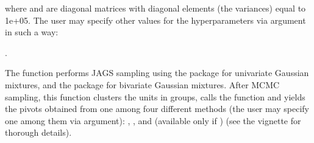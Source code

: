 \documentclass[a4paper]{book}
\begin{document}
\begin{Details}
where  and  are diagonal matrices
with diagonal elements (the variances)
equal to 1e+05. The user may specify other values for the hyperparameters
 via  argument in such a way:

.


The function performs JAGS sampling using the  package for univariate Gaussian mixtures, and the 
package for bivariate Gaussian mixtures. After MCMC sampling, this function
clusters the units in  groups,
calls the  function and yields the
pivots obtained from one among four different
methods (the user may specify one among them via 
argument):
, ,  and 
(available only if )
(see the vignette for thorough details).
\end{Details}
%
\end{document}
